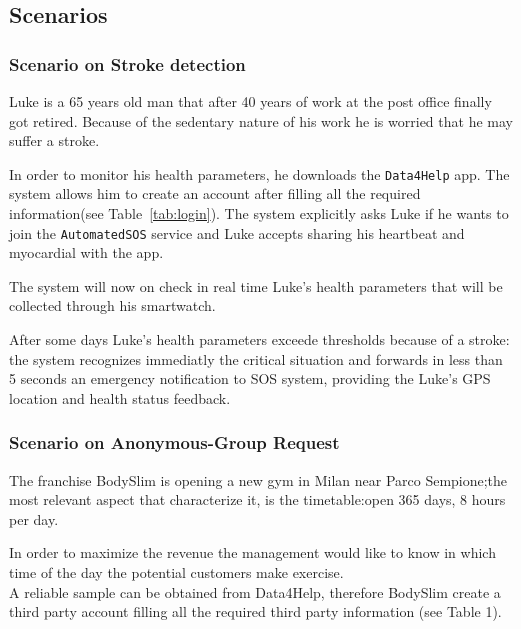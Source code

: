   \subsection{Scenarios}

\subsubsection{Scenario on Stroke detection} %
    \label{sec:}

      Luke is a 65 years old man that after 40 years of work at the post office finally got retired. Because of the sedentary nature of his work he is worried that he may suffer a stroke.

      In order to monitor his health parameters, %
      he downloads the \texttt{Data4Help} app. The system allows him to create an account after filling all the required information(see Table~\ref{tab:login}). The system explicitly asks Luke if he wants to join the \texttt{AutomatedSOS} service and Luke accepts sharing his heartbeat and myocardial with the app.

The system will now on check in real time Luke's health parameters that will be collected through his smartwatch. %

      After some days Luke's health parameters exceede thresholds because of a stroke: the system recognizes immediatly the critical situation and forwards in less than 5 seconds an emergency notification to SOS system, providing the Luke's GPS location and health status feedback.


    \subsubsection{Scenario on Anonymous-Group Request}

    The franchise BodySlim is opening a new gym in Milan near Parco Sempione;the most relevant aspect that characterize it, is the timetable:open 365 days, 8 hours per day. 

In order to maximize the revenue the management would like to know in which time of the day the potential customers make exercise.\\A reliable sample can be obtained from Data4Help, therefore BodySlim create a third party account filling all the required third party information (see Table 1). 


